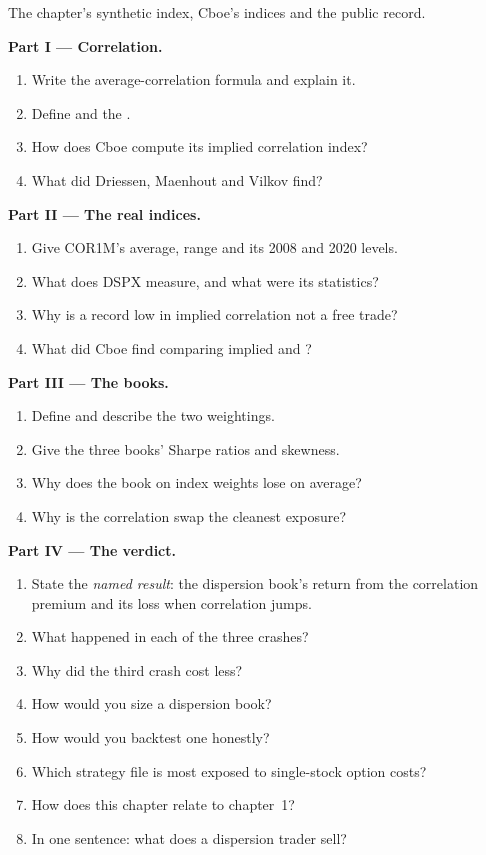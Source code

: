 \begin{problem}\label{pb:s2:dispersion-and-correlation:1}
The chapter's synthetic index, Cboe's indices and the public record.

\medskip\noindent\textbf{Part I --- Correlation.}
\begin{enumerate}
\item Write the average-correlation formula and explain it.
\item Define  and the .
\item How does Cboe compute its implied correlation index?
\item What did Driessen, Maenhout and Vilkov find?
\end{enumerate}

\medskip\noindent\textbf{Part II --- The real indices.}
\begin{enumerate}[resume]
\item Give COR1M's average, range and its 2008 and 2020 levels.
\item What does DSPX measure, and what were its statistics?
\item Why is a record low in implied correlation not a free trade?
\item What did Cboe find comparing implied and ?
\end{enumerate}

\medskip\noindent\textbf{Part III --- The books.}
\begin{enumerate}[resume]
\item Define  and describe the two weightings.
\item Give the three books' Sharpe ratios and skewness.
\item Why does the book on index weights lose on average?
\item Why is the correlation swap the cleanest exposure?
\end{enumerate}

\medskip\noindent\textbf{Part IV --- The verdict.}
\begin{enumerate}[resume]
\item State the \emph{named result}: the dispersion book's return from the correlation premium and its loss when correlation jumps.
\item What happened in each of the three crashes?
\item Why did the third crash cost less?
\item How would you size a dispersion book?
\item How would you backtest one honestly?
\item Which strategy file is most exposed to single-stock option costs?
\item How does this chapter relate to chapter~1?
\item In one sentence: what does a dispersion trader sell?
\end{enumerate}
\end{problem}

